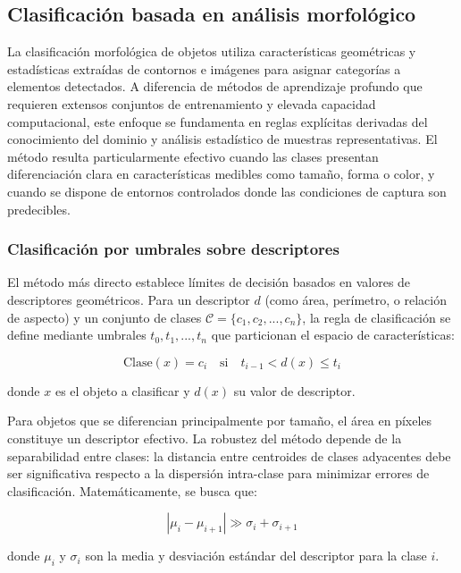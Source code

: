 \subsection{Clasificación basada en análisis morfológico}

La clasificación morfológica de objetos utiliza características geométricas y estadísticas extraídas de contornos e imágenes para asignar categorías a elementos detectados. A diferencia de métodos de aprendizaje profundo que requieren extensos conjuntos de entrenamiento y elevada capacidad computacional, este enfoque se fundamenta en reglas explícitas derivadas del conocimiento del dominio y análisis estadístico de muestras representativas. El método resulta particularmente efectivo cuando las clases presentan diferenciación clara en características medibles como tamaño, forma o color, y cuando se dispone de entornos controlados donde las condiciones de captura son predecibles.

\subsubsection{Clasificación por umbrales sobre descriptores}

El método más directo establece límites de decisión basados en valores de descriptores geométricos. Para un descriptor $d$ (como área, perímetro, o relación de aspecto) y un conjunto de clases $\mathcal{C} = \{c_1, c_2, ..., c_n\}$, la regla de clasificación se define mediante umbrales $t_0, t_1, ..., t_n$ que particionan el espacio de características:

\begin{equation}
\text{Clase}(x) = c_i \quad \text{si} \quad t_{i-1} < d(x) \leq t_i
\end{equation}

donde $x$ es el objeto a clasificar y $d(x)$ su valor de descriptor.

Para objetos que se diferencian principalmente por tamaño, el área en píxeles constituye un descriptor efectivo. La robustez del método depende de la separabilidad entre clases: la distancia entre centroides de clases adyacentes debe ser significativa respecto a la dispersión intra-clase para minimizar errores de clasificación. Matemáticamente, se busca que:

\begin{equation}
|\mu_i - \mu_{i+1}| \gg \sigma_i + \sigma_{i+1}
\end{equation}

donde $\mu_i$ y $\sigma_i$ son la media y desviación estándar del descriptor para la clase $i$.

